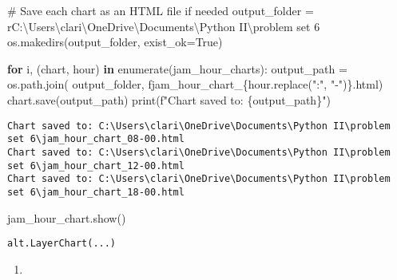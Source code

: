 \documentclass[
  letterpaper,
  DIV=11,
  numbers=noendperiod]{scrartcl}
\newenvironment{Shaded}{\begin{snugshade}}{\end{snugshade}}
\newcommand{\BuiltInTok}[1]{\textcolor[rgb]{0.00,0.23,0.31}{#1}}
\newcommand{\CommentTok}[1]{\textcolor[rgb]{0.37,0.37,0.37}{#1}}
\newcommand{\ControlFlowTok}[1]{\textcolor[rgb]{0.00,0.23,0.31}{\textbf{#1}}}
\newcommand{\KeywordTok}[1]{\textcolor[rgb]{0.00,0.23,0.31}{\textbf{#1}}}
\newcommand{\NormalTok}[1]{\textcolor[rgb]{0.00,0.23,0.31}{#1}}
\newcommand{\OperatorTok}[1]{\textcolor[rgb]{0.37,0.37,0.37}{#1}}
\newcommand{\SpecialCharTok}[1]{\textcolor[rgb]{0.37,0.37,0.37}{#1}}
\newcommand{\SpecialStringTok}[1]{\textcolor[rgb]{0.13,0.47,0.30}{#1}}
\newcommand{\StringTok}[1]{\textcolor[rgb]{0.13,0.47,0.30}{#1}}
\newcommand{\VariableTok}[1]{\textcolor[rgb]{0.07,0.07,0.07}{#1}}
\newcommand{\VerbatimStringTok}[1]{\textcolor[rgb]{0.13,0.47,0.30}{#1}}
\providecommand{\tightlist}{%
  \setlength{\itemsep}{0pt}\setlength{\parskip}{0pt}}\usepackage{longtable,booktabs,array}
\begin{document}
\begin{Shaded}
\begin{Highlighting}[]
\CommentTok{\# Save each chart as an HTML file if needed}
\NormalTok{output\_folder }\OperatorTok{=} \VerbatimStringTok{r\textquotesingle{}C:\textbackslash{}Users\textbackslash{}clari\textbackslash{}OneDrive\textbackslash{}Documents\textbackslash{}Python II\textbackslash{}problem set 6\textquotesingle{}}
\NormalTok{os.makedirs(output\_folder, exist\_ok}\OperatorTok{=}\VariableTok{True}\NormalTok{)}

\ControlFlowTok{for}\NormalTok{ i, (chart, hour) }\KeywordTok{in} \BuiltInTok{enumerate}\NormalTok{(jam\_hour\_charts):}
\NormalTok{    output\_path }\OperatorTok{=}\NormalTok{ os.path.join(}
\NormalTok{        output\_folder, }\SpecialStringTok{f\textquotesingle{}jam\_hour\_chart\_}\SpecialCharTok{\{}\NormalTok{hour}\SpecialCharTok{.}\NormalTok{replace(}\StringTok{":"}\NormalTok{, }\StringTok{"{-}"}\NormalTok{)}\SpecialCharTok{\}}\SpecialStringTok{.html\textquotesingle{}}\NormalTok{)}
\NormalTok{    chart.save(output\_path)}
    \BuiltInTok{print}\NormalTok{(}\SpecialStringTok{f"Chart saved to: }\SpecialCharTok{\{}\NormalTok{output\_path}\SpecialCharTok{\}}\SpecialStringTok{"}\NormalTok{)}
\end{Highlighting}
\end{Shaded}

\begin{verbatim}
Chart saved to: C:\Users\clari\OneDrive\Documents\Python II\problem set 6\jam_hour_chart_08-00.html
Chart saved to: C:\Users\clari\OneDrive\Documents\Python II\problem set 6\jam_hour_chart_12-00.html
Chart saved to: C:\Users\clari\OneDrive\Documents\Python II\problem set 6\jam_hour_chart_18-00.html
\end{verbatim}

\begin{Shaded}
\begin{Highlighting}[]
\NormalTok{jam\_hour\_chart.show()}
\end{Highlighting}
\end{Shaded}

\begin{verbatim}
alt.LayerChart(...)
\end{verbatim}

\begin{enumerate}
\def\labelenumi{\arabic{enumi}.}
\setcounter{enumi}{1}
\tightlist
\item
\end{enumerate}
\end{document}
